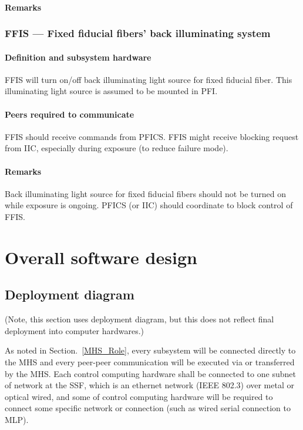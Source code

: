 \documentclass[a4paper,notitlepage]{article}
\begin{document}
\paragraph{Remarks}
\tbd

\subsubsection{FFIS --- Fixed fiducial fibers' back illuminating system}
\paragraph{Definition and subsystem hardware}
FFIS will turn on/off back illuminating light source for fixed fiducial fiber. 
This illuminating light source is assumed to be mounted in PFI. 
\paragraph{Peers required to communicate}
FFIS should receive commands from PFICS. 
FFIS might receive blocking request from IIC, especially during exposure 
(to reduce failure mode). 
\paragraph{Remarks}
Back illuminating light source for fixed fiducial fibers should not be turned 
on while exposure is ongoing. 
PFICS (or IIC) should coordinate to block control of FFIS. 


\section{Overall software design}

\subsection{Deployment diagram}

(Note, this section uses deployment diagram, but this does not reflect final 
deployment into computer hardwares.)

As noted in Section.~\ref{MHS_Role}, 
every subsystem will be connected directly to the MHS and 
every peer-peer communication will be executed via or transferred by the MHS. 
Each control computing hardware shall be connected to one subnet of network 
at the SSF, which is an ethernet network (IEEE 802.3) over metal or optical 
wired, and some of control computing hardware will be required to connect 
some specific network or connection (such as wired serial connection to MLP). 
\end{document}
